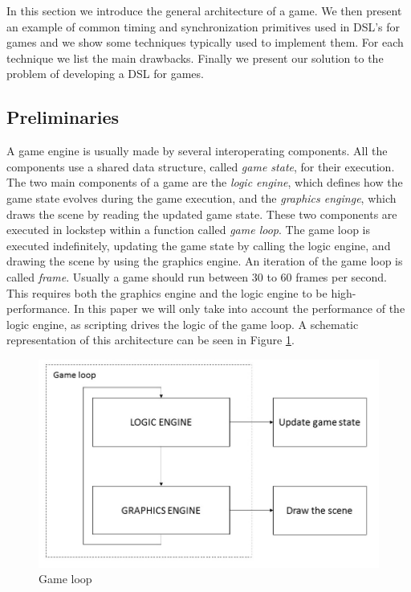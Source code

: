 In this section we introduce the general architecture of a game. We then present an example of common timing and synchronization primitives used in DSL's for games and we show some techniques typically used to implement them. For each technique we list the main drawbacks. Finally we present our solution to the problem of developing a DSL for games.

\subsection{Preliminaries}
A game engine is usually made by several interoperating components. All the components use a shared data structure, called \textit{game state}, for their execution. The two main components of a game are the \textit{logic engine}, which defines how the game state evolves during the game execution, and the \textit{graphics enginge}, which draws the scene by reading the updated game state. These two components are executed in lockstep within a function called \textit{game loop}. The game loop is executed indefinitely, updating the game state by calling the logic engine, and drawing the scene by using the graphics engine. An iteration of the game loop is called \textit{frame}. Usually a game should run between 30 to 60 frames per second. This requires both the graphics engine and the logic engine to be high-performance. In this paper we will only take into account the performance of the logic engine, as scripting drives the logic of the game loop. A schematic representation of this architecture can be seen in Figure \ref{fig:game_loop}.

\begin{figure}
	\centering
	\includegraphics[scale=0.3]{Pictures/game_loop}
	\caption{Game loop}
	\label{fig:game_loop}
\end{figure}

